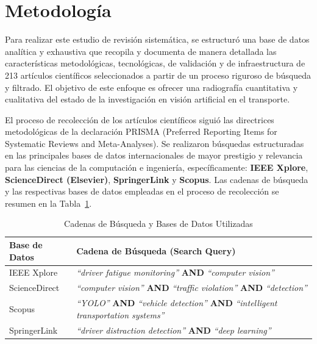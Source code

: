 \section{Metodología}
Para realizar este estudio de revisión sistemática, se estructuró una base de datos analítica y exhaustiva que recopila y documenta de manera detallada las características metodológicas, tecnológicas, de validación y de infraestructura de 213 artículos científicos seleccionados a partir de un proceso riguroso de búsqueda y filtrado. El objetivo de este enfoque es ofrecer una radiografía cuantitativa y cualitativa del estado de la investigación en visión artificial en el transporte.

El proceso de recolección de los artículos científicos siguió las directrices metodológicas de la declaración PRISMA (Preferred Reporting Items for Systematic Reviews and Meta-Analyses). Se realizaron búsquedas estructuradas en las principales bases de datos internacionales de mayor prestigio y relevancia para las ciencias de la computación e ingeniería, específicamente: \textbf{IEEE Xplore}, \textbf{ScienceDirect (Elsevier)}, \textbf{SpringerLink} y \textbf{Scopus}. Las cadenas de búsqueda y las respectivas bases de datos empleadas en el proceso de recolección se resumen en la Tabla~\ref{tab:cadenas_busqueda}.

\begin{table}[htbp]
\centering
\renewcommand{\arraystretch}{1.3}
\caption{Cadenas de Búsqueda y Bases de Datos Utilizadas}
\label{tab:cadenas_busqueda}
\begin{tabular}{@{}l p{6.2cm}@{}}
\toprule
\textbf{Base de Datos} & \textbf{Cadena de Búsqueda (Search Query)} \\
\midrule
IEEE Xplore & \textit{``driver fatigue monitoring''} \textbf{AND} \textit{``computer vision''} \\
ScienceDirect & \textit{``computer vision''} \textbf{AND} \textit{``traffic violation''} \textbf{AND} \textit{``detection''} \\
Scopus & \textit{``YOLO''} \textbf{AND} \textit{``vehicle detection''} \textbf{AND} \textit{``intelligent transportation systems''} \\
SpringerLink & \textit{``driver distraction detection''} \textbf{AND} \textit{``deep learning''} \\
\bottomrule
\end{tabular}
\end{table}

